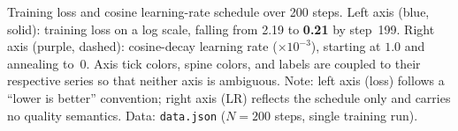 \caption{Training loss and cosine learning-rate schedule over 200 steps.
Left axis (blue, solid): training loss on a log scale, falling from 2.19 to \textbf{0.21} by step~199.
Right axis (purple, dashed): cosine-decay learning rate ($\times 10^{-3}$), starting at $1.0$ and annealing to~$0$.
Axis tick colors, spine colors, and labels are coupled to their respective series so that neither axis is ambiguous.
Note: left axis (loss) follows a ``lower is better'' convention; right axis (LR) reflects the schedule only and carries no quality semantics.
Data: \texttt{data.json} ($N=200$ steps, single training run).}

